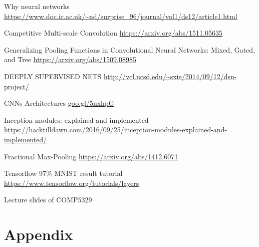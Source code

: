\documentclass[fleqn,10pt]{SelfArx} %
\begin{document}
\begin{thebibliography}{9}
Why neural networks
\newline
\url{https://www.doc.ic.ac.uk/~nd/surprise_96/journal/vol1/ds12/article1.html}

Competitive Multi-scale Convolution
\newline
\url{https://arxiv.org/abs/1511.05635}

Generalizing Pooling Functions in Convolutional Neural Networks: Mixed, Gated, and Tree
\newline
\url{https://arxiv.org/abs/1509.08985}

DEEPLY SUPERVISED NETS
\newline
\url{http://vcl.ucsd.edu/~sxie/2014/09/12/dsn-project/}

CNNs Architectures
\newline
\url{goo.gl/5nxhpG}

Inception modules: explained and implemented
\newline
\url{https://hacktilldawn.com/2016/09/25/inception-modules-explained-and-implemented/}

Fractional Max-Pooling
\newline
\url{https://arxiv.org/abs/1412.6071}

Tensorflow 97\% MNIST result tutorial
\newline
\url{https://www.tensorflow.org/tutorials/layers}

Lecture slides of COMP5329
 \end{thebibliography}


\section{Appendix}
\end{document}
